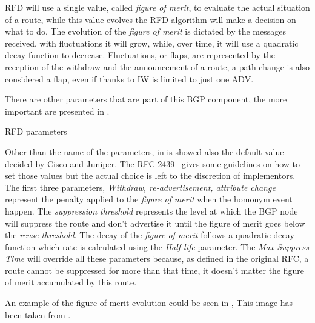 \ac{RFD} will use a single value, called \textit{figure of merit}, to evaluate
the actual situation of a route, while this value evolves the \ac{RFD} algorithm
will make a decision on what to do.
The evolution of the \textit{figure of merit} is dictated by the messages received,
with fluctuations it will grow, while, over time, it will use a quadratic decay
function to decrease.
Fluctuations, or flaps, are represented by the reception of the withdraw and
the announcement of a route, a path change is also considered a flap, even
if thanks to \ac{IW} is limited to just one \ac{ADV}.

There are other parameters that are part of this \ac{BGP} component, the more
important are presented in .

\begin{table}[ht]
	
		\caption{\ac{RFD} parameters}
	\label{tbl:rfd_defaults}
\end{table}

Other than the name of the parameters, in  is showed also
the default value decided by Cisco and Juniper.
The \ac{RFC} \num{2439}~\cite{rfc2439} gives some guidelines on how to set those
values but the actual choice is left to the discretion of implementors.
The first three parameters, \textit{Withdraw, re-advertisement, attribute change}
represent the penalty applied to the \textit{figure of merit} when the homonym event
happen.
The \textit{suppression threshold} represents the level at which the \ac{BGP} node will
suppress the route and don't advertise it until the figure of merit goes
below the \textit{reuse threshold}.
The decay of the \textit{figure of merit} follows a quadratic decay function
which rate is calculated using the \textit{Half-life} parameter.
The \textit{Max Suppress Time} will override all these parameters because, as
defined in the original \ac{RFC}, a route cannot be suppressed for more than
that time, it doesn't matter the figure of merit accumulated by this route.

An example of the figure of merit evolution could be seen in ,
This image has been taken from \cite{gray2020bgp}.

